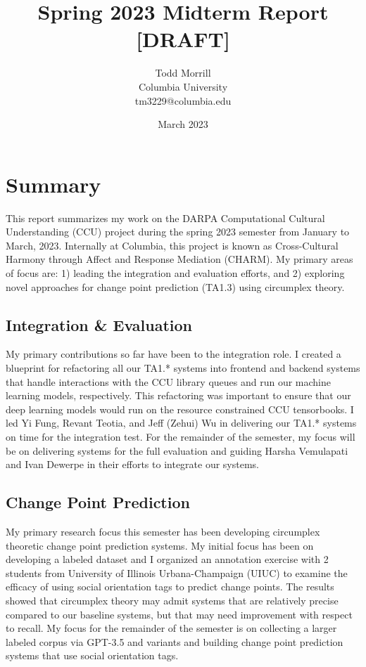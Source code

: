\documentclass[12pt]{article}
\title{Spring 2023 Midterm Report [DRAFT]}
\author{Todd Morrill\\
Columbia University\\
tm3229@columbia.edu}
\date{March 2023}
\begin{document}
\maketitle

\section{Summary}
This report summarizes my work on the DARPA Computational Cultural Understanding (CCU) \cite{DARPA_2021} project during the spring 2023 semester from January to March, 2023. Internally at Columbia, this project is known as Cross-Cultural Harmony through Affect and Response Mediation (CHARM). My primary areas of focus are: 1) leading the integration and evaluation efforts, and 2) exploring novel approaches for change point prediction (TA1.3) using circumplex theory.

\subsection{Integration \& Evaluation} My primary contributions so far have been to the integration role. I created a blueprint for refactoring all our TA1.* systems into frontend and backend systems that handle interactions with the CCU library queues and run our machine learning models, respectively. This refactoring was important to ensure that our deep learning models would run on the resource constrained CCU tensorbooks. I led Yi Fung, Revant Teotia, and Jeff (Zehui) Wu in delivering our TA1.* systems on time for the integration test. For the remainder of the semester, my focus will be on delivering systems for the full evaluation and guiding Harsha Vemulapati and Ivan Dewerpe in their efforts to integrate our systems.

\subsection{Change Point Prediction} My primary research focus this semester has been developing circumplex theoretic change point prediction systems. My initial focus has been on developing a labeled dataset and I organized an annotation exercise with 2 students from University of Illinois Urbana-Champaign (UIUC) to examine the efficacy of using social orientation tags to predict change points. The results showed that circumplex theory may admit systems that are relatively precise compared to our baseline systems, but that may need improvement with respect to recall. My focus for the remainder of the semester is on collecting a larger labeled corpus via GPT-3.5 and variants and building change point prediction systems that use social orientation tags.
\end{document}
